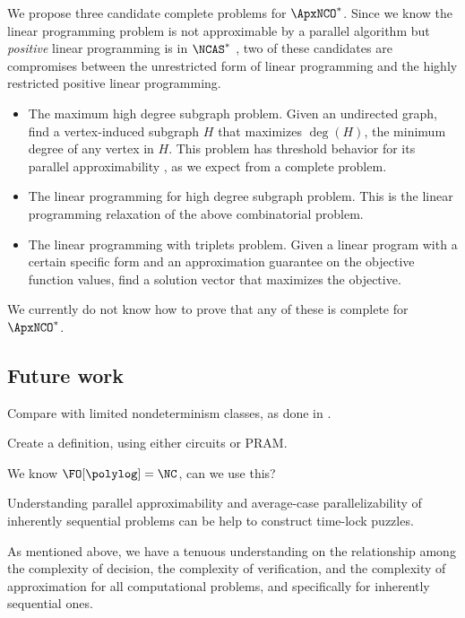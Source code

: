 \documentclass{article}
\begin{document}
We propose three candidate complete problems for $\ApxNCO^*$.
Since we know the linear programming problem is not approximable by a parallel algorithm but \emph{positive} linear programming is in $\NCAS^*$ \autocite{ln93}, two of these candidates are compromises between the unrestricted form of linear programming and the highly restricted positive linear programming.
\begin{itemize}
\item
  The maximum high degree subgraph problem.
  Given an undirected graph, find a vertex-induced subgraph $H$ that maximizes $\deg(H)$, the minimum degree of any vertex in $H$.
  This problem has threshold behavior for its parallel approximability \autocite{am84}, as we expect from a complete problem.
\item
  The linear programming for high degree subgraph problem.
  This is the linear programming relaxation of the above combinatorial problem.
\item
  The linear programming with triplets problem.
  Given a linear program with a certain specific form and an approximation guarantee on the objective function values, find a solution vector that maximizes the objective.
\end{itemize}

We currently do not know how to prove that any of these is complete for $\ApxNCO^*$.

\subsection{Future work}

\begin{description}[style=nextline]
\item[Fixed parameter parallelizable problems \autocite{parallel}]
  Compare with limited nondeterminism classes, as done in \autocite[Section~4.4]{fg06}.
\item[Average-case parallelizable problems \autocite{parallel}]
  Create a definition, using either circuits or PRAM.
\item[Syntactic definition of $\ApxNCO^*$ \autocite{ncapproximation}]
  We know $\FO[\polylog] = \NC$, can we use this?
\item[Time-lock puzzles \autocite{timelock}]
  Understanding parallel approximability and average-case parallelizability of inherently sequential problems can be help to construct time-lock puzzles.
\item[Relating complexity of decision, verification, and approximation \autocite{limndver}]
  As mentioned above, we have a tenuous understanding on the relationship among the complexity of decision, the complexity of verification, and the complexity of approximation for all computational problems, and specifically for inherently sequential ones.
\end{description}
\end{document}
